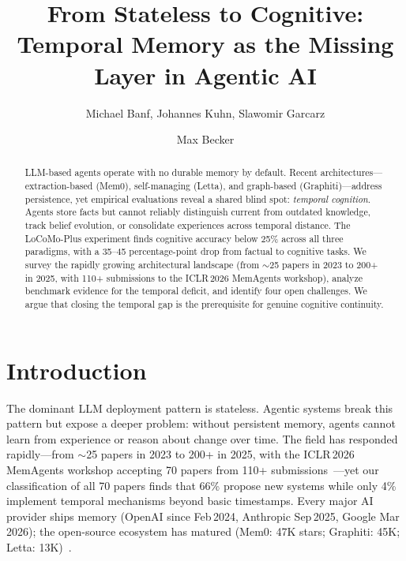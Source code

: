 \documentclass[runningheads]{llncs}
\begin{document}
\title{From Stateless to Cognitive: Temporal Memory as the Missing Layer in Agentic AI}


\author{Michael Banf, Johannes Kuhn, Slawomir Garcarz \and Max Becker}



\maketitle

\begin{abstract}
LLM-based agents operate with no durable memory by default. Recent
architectures---extraction-based (Mem0), self-managing (Letta), and
graph-based (Graphiti)---address persistence, yet empirical evaluations
reveal a shared blind spot: \emph{temporal cognition}. Agents store facts
but cannot reliably distinguish current from outdated knowledge, track
belief evolution, or consolidate experiences across temporal distance. The
LoCoMo-Plus experiment finds cognitive accuracy below 25\% across all three
paradigms, with a 35--45 percentage-point drop from factual to cognitive
tasks. We survey the rapidly growing architectural landscape (from $\sim$25
papers in 2023 to 200+ in 2025, with 110+ submissions to the ICLR\,2026
MemAgents workshop), analyze benchmark evidence for the temporal deficit,
and identify four open challenges. We argue that closing the temporal gap
is the prerequisite for genuine cognitive continuity.

\end{abstract}

\section{Introduction}

The dominant LLM deployment pattern is stateless. Agentic systems break
this pattern but expose a deeper problem: without persistent memory,
agents cannot learn from experience or reason about change over time.
The field has responded rapidly---from $\sim$25 papers in 2023 to 200+ in
2025, with the ICLR\,2026 MemAgents workshop accepting 70 papers from 110+
submissions~\cite{memagents2026}---yet our classification of all 70
papers finds that 66\% propose new systems while only 4\% implement
temporal mechanisms beyond basic timestamps. Every major AI provider ships
memory (OpenAI since Feb\,2024, Anthropic Sep\,2025, Google Mar\,2026);
the open-source ecosystem has matured (Mem0: 47K stars; Graphiti: 45K;
Letta: 13K)~\cite{hu2025}.
\end{document}
